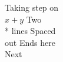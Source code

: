 \documentclass{article}
\begin{document}
\begin{algorithmic}[1]
\STATE Taking step on  \\
$x+y$
\STATE Two \\* lines
\STATE Spaced \\[2pt] out
\STATE Ends here \\
\STATE Next
\end{algorithmic}
\end{document}
